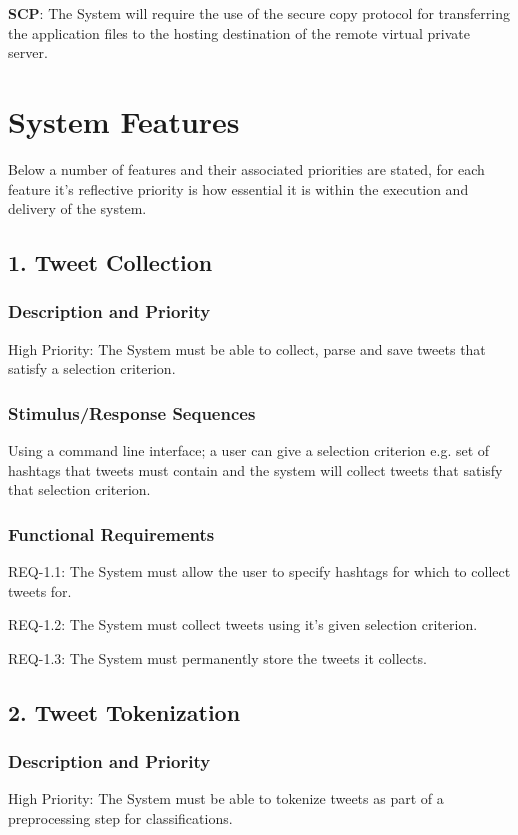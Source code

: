 \documentclass[11pt]{report}
\begin{document}
\textbf{SCP}: The System will require the use of the secure copy protocol for transferring the application files to the hosting destination of the remote virtual private server.
 
\section*{System Features}
Below a number of features and their associated priorities are stated, for each feature it’s reflective priority is how essential it is within the execution and delivery of the system.

\subsection*{1. Tweet Collection}
\subsubsection*{Description and Priority}
High Priority: The System must be able to collect, parse and save tweets that satisfy a selection criterion.
\subsubsection*{Stimulus/Response Sequences}
Using a command line interface; a user can give a selection criterion e.g. set of hashtags that tweets must contain and the system will collect tweets that satisfy that selection criterion.
\subsubsection*{Functional Requirements}
REQ-1.1:	The System must allow the user to specify hashtags for which to collect tweets for.

REQ-1.2: The System must collect tweets using it’s given selection criterion.

REQ-1.3: The System must permanently store the tweets it collects.

\subsection*{2. Tweet Tokenization}
\subsubsection*{Description and Priority}
High Priority: The System must be able to tokenize tweets as part of a preprocessing step for classifications.
\end{document}

